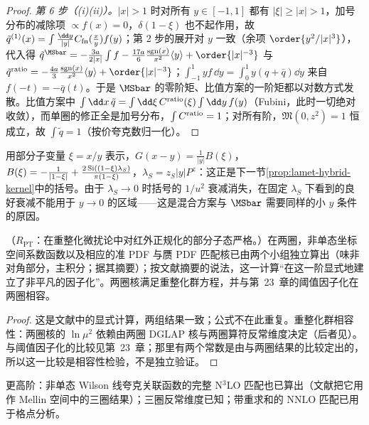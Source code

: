 \begin{proof}
\emph{第 6 步（(i)(ii)）。}$|x|>1$ 时对所有 $y\in[-1,1]$ 都有 $|\xi|\ge|x|>1$，加号分布的减除项 $\propto f(x)=0$，$\delta(1-\xi)$ 也不起作用，故 $\tilde q^{(1)}(x)=\int\frac{\dd y}{|y|}C_{\rm fn}(\frac xy)f(y)$；第 2 步的展开对 $y$ 一致（余项 $\order{y^2/|x|^3}$），代入得 $\tilde q^{\MSbar}=-\frac{3a}{2|x|}\int f-\frac{17a}6\frac{{\rm sgn}(x)}{x^2}\langle y\rangle+\order{|x|^{-3}}$ 与 $\tilde q^{\rm ratio}=-\frac{4a}3\frac{{\rm sgn}(x)}{x^2}\langle y\rangle+\order{|x|^{-3}}$；$\int_{-1}^1yf\,\dd y=\int_0^1y(q+\bar q)\dd y$ 来自 $f(-t)=-\bar q(t)$。于是 $\MSbar$ 的零阶矩、比值方案的一阶矩都以对数方式发散。比值方案中 $\int\dd x\,\tilde q=\int\dd\xi\,C^{\rm ratio}(\xi)\int\dd y\,f(y)$（Fubini，此时一切绝对收敛），而单圈的修正全是加号分布，$\int C^{\rm ratio}=1$；对所有阶，$\mathfrak M(0,z^2)=1$ 恒成立，故 $\int\tilde q=1$（按价夸克数归一化）。
\end{proof}

用部分子变量 $\xi=x/y$ 表示，$G(x-y)=\frac1{|y|}B(\xi)$，$B(\xi)=-\frac1{|1-\xi|}+\frac{2\,{\rm Si}((1-\xi)\lambda_S)}{\pi(1-\xi)}$，$\lambda_S=z_S|y|P^z$：这正是下一节\cref{prop:lamet-hybrid-kernel}中的括号。由于 $\lambda_S\to0$ 时括号的 $1/u^2$ 衰减消失，在固定 $\lambda_S$ 下看到的良好衰减不能用于 $y\to0$ 的区域——这是混合方案与 $\MSbar$ 需要同样的小 $y$ 条件的原因。

\begin{proposition}\label{prop:lamet-twoloop}
（$R_{\mathrm{PT}}$：在重整化微扰论中对红外正规化的部分子态严格。）在两圈，非单态坐标空间系数函数以及相应的准 PDF 与赝 PDF 匹配核已由两个小组独立算出\cite{Li:2020xml,Chen:2020ody}（味非对角部分\cite{Chen:2020arf}，主积分\cite{Chen:2020iqi}；据其摘要）；按文献\cite{Chen:2020ody}摘要的说法，这一计算“在这一阶显式地建立了非平凡的因子化”。两圈核满足重整化群方程，并与第~23~章的阈值因子化在两圈相容。
\end{proposition}

\begin{proof}
这是文献中的显式计算\cite{Li:2020xml,Chen:2020ody}，两组结果一致；公式不在此重复。重整化群相容性：两圈核的 $\ln\mu^2$ 依赖由两圈 DGLAP 核与两圈算符反常维度决定（后者见\cite{Braun:2020ymy}）。与阈值因子化的比较见第~23~章；那里有两个常数是由与两圈结果的比较定出的，所以这一比较是相容性检验，不是独立验证。
\end{proof}

更高阶：非单态 Wilson 线夸克关联函数的完整 N$^3$LO 匹配也已算出\cite{Cheng:2024wyu}（文献\cite{Ji:2024hit}把它用作 Mellin 空间中的三圈结果）；三圈反常维度已知\cite{Braun:2020ymy}；带重求和的 NNLO 匹配已用于格点分析\cite{Gao:2021dbh,Su:2022fiu}。

